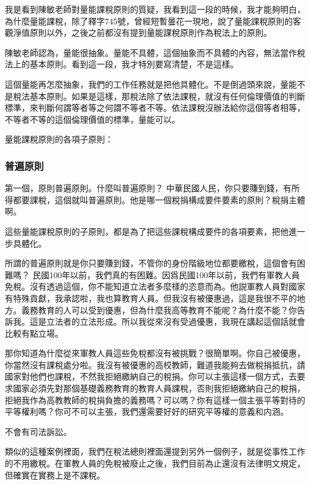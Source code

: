 \documentclass[oneside,sub3section]{ctexbook}
\begin{document}
我是看到陳敏老師對量能課稅原則的質疑，我看到這一段的時候，我才能夠明白，為什麼量能課稅，除了釋字745號，曾經短暫曇花一現地，說了量能課稅原則的客觀淨值原則以外，之後之前都沒有提到量能課稅原則作為稅法上的原則。

陳敏老師認為，量能很抽象。量能不具體，這個抽象而不具體的內容，無法當作稅法上的基本原則。看到這一段，我才特別要寫清楚，不是這樣。

這個量能再怎麼抽象，我們的工作任務就是把他具體化。不是倒過頭來說，量能不是稅法基本原則。如果是這樣，那稅法除了依法課稅，就沒有任何倫理價值的判斷標準，來判斷何謂等者等之何謂不等者不等。依法課稅沒辦法給你這個等者相等，不等者不等的這個倫理價值的標準，量能可以。

量能課稅原則的各項子原則：

\hypertarget{ux666eux904dux539fux5247}{%
\subsubsection{普遍原則}\label{ux666eux904dux539fux5247}}

第一個，原則普遍原則。什麼叫普遍原則？ 中華民國人民，你只要賺到錢，有所得都要課稅，這個就叫普遍原則。他是哪一個稅捐構成要件要素的原則？稅捐主體啊。

這些量能課稅原則的子原則，都是為了把這些課稅構成要件的各項要素，把他進一步具體化。

所謂的普遍原則就是你只要賺到錢，不管你的身份階級地位都要繳稅，這個會有困難嗎？ 民國100年以前，我們真的有困難。因爲民國100年以前，我們有軍教人員免稅。沒有透過這個，你不能知道立法者多麼樣的恣意而為。他説軍教人員對國家有特殊貢獻，我承認啦，我也算教育人員。但我沒有被優惠過，這是我很不平的地方。義務教育的人可以受到優惠，但為什麼我高等教育不能呢？為什麼不能？你告訴我。這是立法者的立法形成。所以我從來沒有受過優惠，我現在講起這個話就會比較有點立場。

那你知道為什麼從來軍教人員這些免稅都沒有被挑戰？很簡單啊。你自己被優惠，你當然沒有課稅處分啦。我沒有被優惠的高校教師，難道我能夠去做稅捐抵抗，請國家對他們也課稅，不然我拒絕繳納自己的稅捐。你可以主張這樣一個方式，去要求國家必須先對那個基礎義務教育的教育人員課稅，否則我拒絕繳納自己的稅捐，拒絕我作為高教教師的稅捐負擔的義務嗎？可以嗎？你有這樣一個主張平等對待的平等權利嗎？你可不可以主張，我們還需要好好的研究平等權的意義和内涵。

不會有司法訴訟。

類似的這種案例裡面，我們在稅法總則裡面還提到另外一個例子，就是從事性工作的不用繳稅。在軍教人員的免稅被廢止之後，我們目前為止還沒有法律明文規定，但確實在實務上是不課稅。
\end{document}
